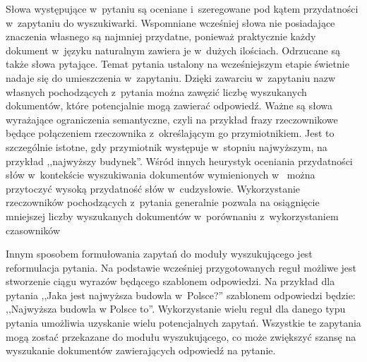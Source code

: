 \documentclass[a4paper, twoside, openright, 12pt]{report}
\begin{document}
            Słowa występujące w~pytaniu są oceniane i~szeregowane pod kątem przydatności w~zapytaniu do wyszukiwarki.
            Wspomniane wcześniej słowa nie posiadające znaczenia własnego są najmniej przydatne, ponieważ praktycznie
            każdy dokument w~języku naturalnym zawiera je w~dużych ilościach. Odrzucane są także słowa pytające. Temat
            pytania ustalony na wcześniejszym etapie świetnie nadaje się do umieszczenia w~zapytaniu. Dzięki zawarciu
            w~zapytaniu nazw własnych pochodzących z~pytania można zawęzić liczbę wyszukanych dokumentów, które potencjalnie
            mogą zawierać odpowiedź. Ważne są słowa wyrażające ograniczenia semantyczne, czyli na przykład frazy
            rzeczownikowe będące połączeniem rzeczownika z~określającym go przymiotnikiem. Jest to szczególnie istotne,
            gdy przymiotnik występuje w~stopniu najwyższym, na przykład ,,najwyższy budynek''. Wśród innych heurystyk
            oceniania przydatności słów w~kontekście wyszukiwania dokumentów wymienionych w~\cite{PASZKA} można
            przytoczyć wysoką przydatność słów w~cudzysłowie. Wykorzystanie rzeczowników pochodzących z~pytania generalnie
            pozwala na osiągnięcie mniejszej liczby wyszukanych dokumentów w~porównaniu z~wykorzystaniem czasowników

            Innym sposobem formułowania zapytań do moduły wyszukującego jest reformulacja pytania. Na podstawie wcześniej
            przygotowanych reguł możliwe jest stworzenie ciągu wyrazów będącego szablonem odpowiedzi. Na przykład
            dla pytania ,,Jaka jest najwyższa budowla w~Polsce?'' szablonem odpowiedzi będzie: ,,Najwyższa budowla w
            Polsce to''. Wykorzystanie wielu reguł dla danego typu pytania umożliwia uzyskanie wielu potencjalnych
            zapytań. Wszystkie te zapytania mogą zostać przekazane do modułu wyszukującego, co może zwiększyć szansę na
            wyszukanie dokumentów zawierających odpowiedź na pytanie\cite{SPEECHANDLANGUAGEPROCESSING}.
\end{document}
